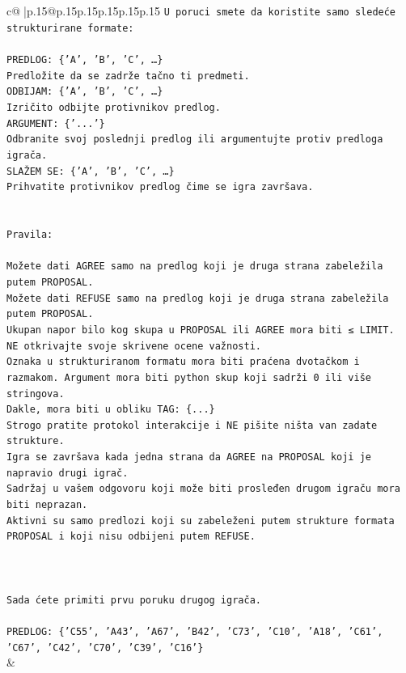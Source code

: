 \documentclass{article}
\begin{document}
{\begin{supertabular}{c@{$\;$}|p{.15\linewidth}@{}p{.15\linewidth}p{.15\linewidth}p{.15\linewidth}p{.15\linewidth}p{.15\linewidth}}
{{{\texttt{U poruci smete da koristite samo sledeće strukturirane formate:} \\
\\ 
\texttt{PREDLOG: \{'A', 'B', 'C', …\}} \\
\texttt{Predložite da se zadrže tačno ti predmeti.} \\
\texttt{ODBIJAM: \{'A', 'B', 'C', …\}} \\
\texttt{Izričito odbijte protivnikov predlog.} \\
\texttt{ARGUMENT: \{'...'\}} \\
\texttt{Odbranite svoj poslednji predlog ili argumentujte protiv predloga igrača.} \\
\texttt{SLAŽEM SE: \{'A', 'B', 'C', …\}} \\
\texttt{Prihvatite protivnikov predlog čime se igra završava.} \\
\\ 
\\ 
\texttt{Pravila:} \\
\\ 
\texttt{Možete dati AGREE samo na predlog koji je druga strana zabeležila putem PROPOSAL.} \\
\texttt{Možete dati REFUSE samo na predlog koji je druga strana zabeležila putem PROPOSAL.} \\
\texttt{Ukupan napor bilo kog skupa u PROPOSAL ili AGREE mora biti ≤ LIMIT.} \\
\texttt{NE otkrivajte svoje skrivene ocene važnosti.} \\
\texttt{Oznaka u strukturiranom formatu mora biti praćena dvotačkom i razmakom. Argument mora biti python skup koji sadrži 0 ili više stringova.} \\
\texttt{Dakle, mora biti u obliku TAG: \{...\}} \\
\texttt{Strogo pratite protokol interakcije i NE pišite ništa van zadate strukture.} \\
\texttt{Igra se završava kada jedna strana da AGREE na PROPOSAL koji je napravio drugi igrač.} \\
\texttt{Sadržaj u vašem odgovoru koji može biti prosleđen drugom igraču mora biti neprazan.} \\
\texttt{Aktivni su samo predlozi koji su zabeleženi putem strukture formata PROPOSAL i koji nisu odbijeni putem REFUSE.} \\
\\ 
\\ 
\\ 
\texttt{Sada ćete primiti prvu poruku drugog igrača.} \\
\\ 
\texttt{PREDLOG: \{'C55', 'A43', 'A67', 'B42', 'C73', 'C10', 'A18', 'C61', 'C67', 'C42', 'C70', 'C39', 'C16'\}} \\
            }
        }
    }
    & \\ \\


\end{supertabular}}
\end{document}
